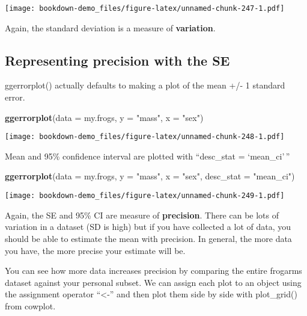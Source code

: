 \documentclass[]{book}
\newenvironment{Shaded}{\begin{snugshade}}{\end{snugshade}}
\newcommand{\KeywordTok}[1]{\textcolor[rgb]{0.13,0.29,0.53}{\textbf{#1}}}
\newcommand{\DataTypeTok}[1]{\textcolor[rgb]{0.13,0.29,0.53}{#1}}
\newcommand{\StringTok}[1]{\textcolor[rgb]{0.31,0.60,0.02}{#1}}
\newcommand{\NormalTok}[1]{#1}
\theoremstyle{definition}
\theoremstyle{definition}
\theoremstyle{definition}
\theoremstyle{remark}
\begin{document}
\texttt{[image: bookdown-demo\_files/figure-latex/unnamed-chunk-247-1.pdf]}

Again, the standard deviation is a measure of \textbf{variation}.

\subsection{Representing precision with the
SE}\label{representing-precision-with-the-se}

ggerrorplot() actually defaults to making a plot of the mean +/- 1
standard error.

\begin{Shaded}
\begin{Highlighting}[]
\KeywordTok{ggerrorplot}\NormalTok{(}\DataTypeTok{data =}\NormalTok{ my.frogs,}
          \DataTypeTok{y =} \StringTok{"mass"}\NormalTok{,}
          \DataTypeTok{x =} \StringTok{"sex"}\NormalTok{)}
\end{Highlighting}
\end{Shaded}

\texttt{[image: bookdown-demo\_files/figure-latex/unnamed-chunk-248-1.pdf]}

Mean and 95\% confidence interval are plotted with ``desc\_stat =
`mean\_ci'\,''

\begin{Shaded}
\begin{Highlighting}[]
\KeywordTok{ggerrorplot}\NormalTok{(}\DataTypeTok{data =}\NormalTok{ my.frogs,}
          \DataTypeTok{y =} \StringTok{"mass"}\NormalTok{,}
          \DataTypeTok{x =} \StringTok{"sex"}\NormalTok{,}
          \DataTypeTok{desc_stat =} \StringTok{"mean_ci"}\NormalTok{)}
\end{Highlighting}
\end{Shaded}

\texttt{[image: bookdown-demo\_files/figure-latex/unnamed-chunk-249-1.pdf]}

Again, the SE and 95\% CI are measure of \textbf{precision}. There can
be lots of variation in a dataset (SD is high) but if you have collected
a lot of data, you should be able to estimate the mean with precision.
In general, the more data you have, the more precise your estimate will
be.

You can see how more data increases precision by comparing the entire
frogarms dataset against your personal subset. We can assign each plot
to an object using the assignment operator ``\textless{}-'' and then
plot them side by side with plot\_grid() from cowplot.
\end{document}
